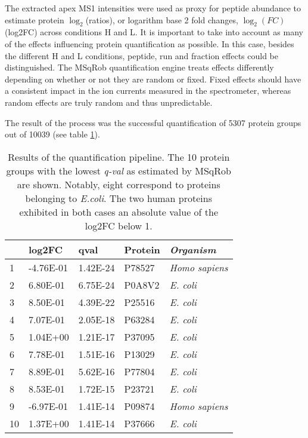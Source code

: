 The extracted apex MS1 intensities were used as proxy for peptide abundance to estimate protein $\log_2$(ratios), or logarithm base 2 fold changes, $\log_2(FC)$ (\ac{log2FC}) across conditions H and L. It is important to take into account as many of the effects influencing protein quantification as possible. In this case, besides the different H and L conditions, peptide, run and fraction effects could be distinguished. The MSqRob quantification engine treats effects differently depending on whether or not they are random or fixed. Fixed effects should have a consistent impact in the ion currents measured in the spectrometer, whereas random effects are truly random and thus unpredictable.

The result of the process was the successful quantification of 5307 protein groups out of 10039 (see table \ref{tab:quantification_table}).

\begin{table}[ht]
\centering
\begin{tabular}{llll>{\itshape}l}
  \toprule
 & \ac{log2FC} & qval & Protein & Organism \\ 
  \midrule
1 & -4.76E-01 & 1.42E-24 & P78527 & Homo sapiens \\ 
   \rowcolor[gray]{0.95}2 & 6.80E-01 & 6.75E-24 & P0A8V2 & E. coli \\ 
  3 & 8.50E-01 & 4.39E-22 & P25516 & E. coli \\ 
   \rowcolor[gray]{0.95}4 & 7.07E-01 & 2.05E-18 & P63284 & E. coli \\ 
  5 & 1.04E+00 & 1.21E-17 & P37095 & E. coli \\ 
   \rowcolor[gray]{0.95}6 & 7.78E-01 & 1.51E-16 & P13029 & E. coli \\ 
  7 & 8.89E-01 & 5.62E-16 & P77804 & E. coli \\ 
   \rowcolor[gray]{0.95}8 & 8.53E-01 & 1.72E-15 & P23721 & E. coli \\ 
  9 & -6.97E-01 & 1.41E-14 & P09874 & Homo sapiens \\ 
   \rowcolor[gray]{0.95}10 & 1.37E+00 & 1.41E-14 & P37666 & E. coli \\ 
   \bottomrule
\end{tabular}
\caption[Proteome benchmark dataset quantification results]{Results of the quantification pipeline. The 10 protein groups with the lowest \textit{q-val}  as estimated by MSqRob are shown. Notably, eight correspond to proteins belonging to \textit{E.coli}. The two human proteins exhibited in both cases an absolute value of the \ac{log2FC} below 1.}
\label{tab:quantification_table}
\end{table}

